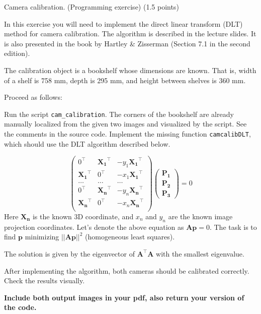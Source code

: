 \documentclass[12pt]{article} %
\newenvironment{exercise}[2][Task]{\begin{trivlist}
\item[\hskip \labelsep {\bfseries #1}\hskip \labelsep {\bfseries #2.}]}{\end{trivlist}}
\begin{document}
\begin{exercise}{2}
Camera calibration. (Programming exercise) (1.5 points)

\vspace{1mm}
\noindent In this exercise you will need to implement the direct linear transform (DLT) method for camera calibration. The algorithm is described in the lecture slides. It is also presented in the book by Hartley \& Zisserman (Section 7.1 in the second edition).

The calibration object is a bookshelf whose dimensions are known. That is, width of a shelf is 758 mm, depth is 295 mm, and height between shelves is 360 mm. 

\vspace{1mm}
\noindent Proceed as follows:
\newline

\noindent Run the script \texttt{cam\_calibration}. The corners of the bookshelf are already manually localized from the given two images and visualized by the script. See the comments in the source code.
 Implement the missing function \texttt{camcalibDLT}, which should use the DLT algorithm described below.
 
\begin{equation*}
	\begin{pmatrix}0^\top & \mathbf{X_1}^\top & -y_1\mathbf{X_1}^\top\\
				   \mathbf{X_1}^\top & 0^\top & -x_1\mathbf{X_1}^\top \\
				   \dots & \dots & \dots\\
				   0^\top & \mathbf{X_n}^\top & -y_n\mathbf{X_n}^\top\\
				   \mathbf{X_n}^\top & 0^\top & -x_n\mathbf{X_n}^\top \\
	 \end{pmatrix}
	\begin{pmatrix}\mathbf{P_1} \\ \mathbf{P_2} \\ \mathbf{P_3} \end{pmatrix}
	 = 0
\end{equation*}
Here $\mathbf{X_n}$ is the known 3D coordinate, and $x_n$ and $y_n$ are the known image projection coordinates. Let's denote the above equation as $\mathbf{A}\mathbf{p}=0$. The task is to find $\mathbf{p}$  minimizing $||\mathbf{Ap}||^2$ (homogeneous least squares).

\newpage 
\noindent The solution is given by the eigenvector of $\mathbf{A}^\top\mathbf{A}$ with the smallest eigenvalue.
\newline

\noindent After implementing the algorithm, both cameras should be calibrated correctly. Check the results visually.

\noindent \textbf{Include both output images in your pdf, also return your version of the code.}

\end{exercise}
\end{document}
